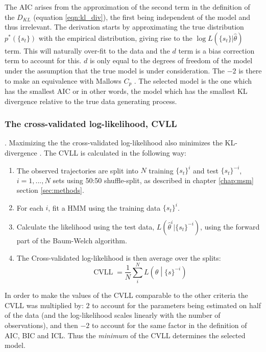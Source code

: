 The AIC arises from the approximation of the second term in the definition of the $D_{KL}$ (equation \ref{eqn:kl_div}), the first being independent of the model and thus irrelevant. The derivation starts by approximating the true distribution $p^{*}(\{s_t\})$ with the empirical distribution, giving rise to the $\log{L\left(\{s_t\}|\hat{\theta}\right)}$ term.  This will naturally over-fit to the data and the  $d$ term is a bias correction term to account for this.  $d$ is only equal to the degrees of freedom of the model under the assumption that the true model is under consideration. The $-2$ is there to make an equivalence with Mallows $C_p$ \cite{friedman2001elements}. The selected model is the one which has the smallest AIC or in other words, the model which has the smallest KL divergence relative to the true data generating process. 

\subsubsection{The cross-validated log-likelihood, CVLL}. Maximizing the the cross-validated log-likelihood also minimizes the KL-divergence \cite{celeuxSelectingHiddenMarkov2008}. The CVLL is calculated in the following way: 
\begin{enumerate}
    \item The observed trajectories are split into $N$ training $\{s_t\}^{i}$ and test $\{s_t\}^{-i}$, $i = 1, ..., N$ sets using 50:50 shuffle-split, as described in chapter \ref{chap:msm} section \ref{sec:methods}. 
    \item For each $i$, fit a HMM using the training data $\{s_t\}^{i}$. 
    \item Calculate the likelihood using the test data,  $L(\hat{\theta}^{i}|\{s_t\}^{-i})$, using the forward part of the Baum-Welch algorithm. 
    \item The Cross-validated log-likelihood is then average over the splits: 
    \begin{equation}
        \operatorname{CVLL} = \frac{1}{N}\sum_{i}^{N}L\left(\theta \middle |\{s\}^{-i}\right)
    \end{equation}
\end{enumerate}

In order to make the values of the CVLL comparable to the other criteria the CVLL was multiplied by: $2$ to account for the parameters being estimated on half of the data (and the log-likelihood scales linearly with the number of observations), and then $-2$ to account for the same factor in the definition of AIC, BIC and ICL. Thus the \emph{minimum} of the CVLL determines the selected model.  


